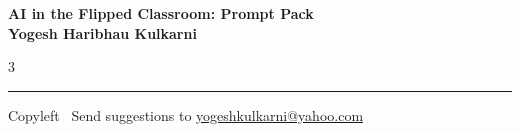 \documentclass[8pt,landscape]{article}
\begin{document}
\footnotesize


\begin{center}
\Large{\textbf{AI in the Flipped Classroom: Prompt Pack\\ Yogesh Haribhau Kulkarni}}
\end{center}

\begin{multicols}{3}

% 
\end{multicols}

\rule{\linewidth}{0.25pt}
\scriptsize
Copyleft \textcopyleft\  Send suggestions to
\href{http://www.yogeshkulkarni.com}{yogeshkulkarni@yahoo.com}
\end{document}
